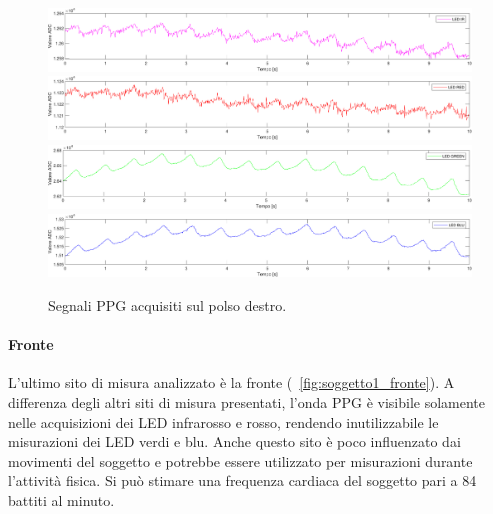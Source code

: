 \begin{figure}[h]
	\centering
	\includegraphics[width=1\linewidth]{ImageFiles/Misure Preliminari/Soggetto 1/polso_ired}
	\includegraphics[width=1\linewidth]{ImageFiles/Misure Preliminari/Soggetto 1/polso_red}
	\includegraphics[width=1\linewidth]{ImageFiles/Misure Preliminari/Soggetto 1/polso_green}
	\includegraphics[width=1\linewidth]{ImageFiles/Misure Preliminari/Soggetto 1/polso_blu}
	\caption{Segnali PPG acquisiti sul polso destro.}
	\label{fig:soggetto1_polso}
\end{figure}

\clearpage

\paragraph{Fronte}


L'ultimo sito di misura analizzato è la fronte (\Fig~\ref{fig:soggetto1_fronte}). A differenza degli altri siti di misura presentati, l'onda PPG è visibile solamente nelle acquisizioni dei LED infrarosso e rosso, rendendo inutilizzabile le misurazioni dei LED verdi e blu. Anche questo sito è poco influenzato dai movimenti del soggetto e potrebbe essere utilizzato per misurazioni durante l'attività fisica. Si può stimare una frequenza cardiaca del soggetto pari a 84 battiti al minuto.

